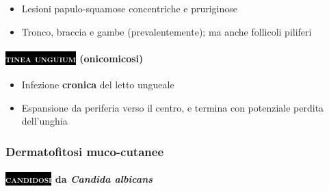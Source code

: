 \documentclass[italian,]{article}
\providecommand{\tightlist}{%
  \setlength{\itemsep}{0pt}\setlength{\parskip}{0pt}}
\newcommand{\pat}[1]{\colorbox{black}{\textcolor{white}{\textsc{#1}}}}
\begin{document}
\begin{itemize}
\tightlist
\item
  Lesioni papulo-squamose concentriche e pruriginose
\item
  Tronco, braccia e gambe (prevalentemente); ma anche follicoli piliferi
\end{itemize}

\hypertarget{onicomicosi}{%
\paragraph{\texorpdfstring{\pat{tinea unguium}
(onicomicosi)}{ (onicomicosi)}}\label{onicomicosi}}

\begin{itemize}
\tightlist
\item
  Infezione \textbf{cronica} del letto ungueale
\item
  Espansione da periferia verso il centro, e termina con potenziale
  perdita dell'unghia
\end{itemize}

\hypertarget{dermatofitosi-muco-cutanee}{%
\subsubsection{Dermatofitosi
muco-cutanee}\label{dermatofitosi-muco-cutanee}}

\hypertarget{da-candida-albicans}{%
\paragraph{\texorpdfstring{\pat{candidosi} da \emph{Candida
albicans}}{ da Candida albicans}}\label{da-candida-albicans}}
\end{document}
